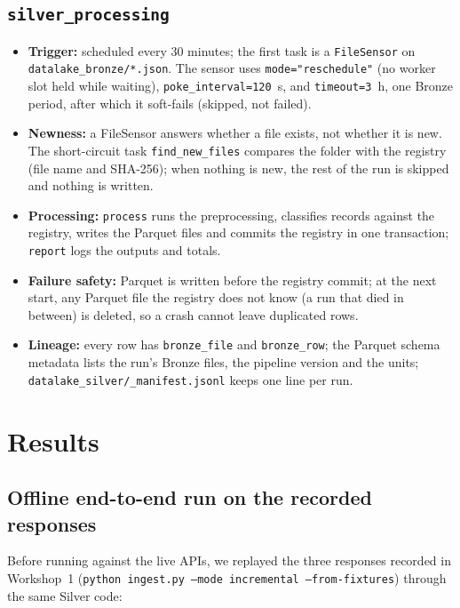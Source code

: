 \documentclass[11pt,a4paper]{article}
\newcommand{\code}[1]{\texttt{\small #1}}
\begin{document}
\subsection{\code{silver\_processing}}

\begin{itemize}
  \item \textbf{Trigger:} scheduled every 30 minutes; the first task is a \code{FileSensor} on
        \code{datalake\_bronze/*.json}. The sensor uses \code{mode="reschedule"} (no worker slot held
        while waiting), \code{poke\_interval=120}~s, and \code{timeout=3}~h, one Bronze period, after
        which it soft-fails (skipped, not failed).
  \item \textbf{Newness:} a FileSensor answers whether a file exists, not whether it is new. The
        short-circuit task \code{find\_new\_files} compares the folder with the registry (file name
        and SHA-256); when nothing is new, the rest of the run is skipped and nothing is written.
  \item \textbf{Processing:} \code{process} runs the preprocessing, classifies records against the
        registry, writes the Parquet files and commits the registry in one transaction;
        \code{report} logs the outputs and totals.
  \item \textbf{Failure safety:} Parquet is written before the registry commit; at the next start,
        any Parquet file the registry does not know (a run that died in between) is deleted, so a
        crash cannot leave duplicated rows.
  \item \textbf{Lineage:} every row has \code{bronze\_file} and \code{bronze\_row}; the Parquet
        schema metadata lists the run's Bronze files, the pipeline version and the units;
        \code{datalake\_silver/\_manifest.jsonl} keeps one line per run.
\end{itemize}

\section{Results}

\subsection{Offline end-to-end run on the recorded responses}

Before running against the live APIs, we replayed the three responses recorded in Workshop~1
(\code{python ingest.py --mode incremental --from-fixtures}) through the same Silver code:
\end{document}
